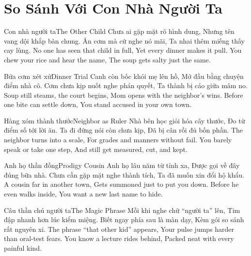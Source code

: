 \chapter{So Sánh Với Con Nhà Người Ta}

\begin{tutuyetbox}{Con nhà người ta}{The Other Child}
Chưa ai gặp mặt rõ hình dung,
Nhưng tên vang dội khắp bàn chung.
Ăn cơm mà cứ nghe nó mãi,
Ta nhai thêm miếng thấy cay lùng.
\tcblower
No one has seen that child in full,
Yet every dinner makes it pull.
You chew your rice and hear the name,
The soup gets salty just the same.
\end{tutuyetbox}

\begin{tutuyetbox}{Bữa cơm xét xử}{Dinner Trial}
Canh còn bốc khói mẹ lên hồ,
Mở đầu bằng chuyện điểm nhà cô.
Cơm chưa kịp nuốt nghe phán quyết,
Ta thành bị cáo giữa mâm no.
\tcblower
Soup still steams, the court begins,
Mom opens with the neighbor's wins.
Before one bite can settle down,
You stand accused in your own town.
\end{tutuyetbox}

\begin{tutuyetbox}{Hàng xóm thành thước}{Neighbor as Ruler}
Nhà bên học giỏi hóa cây thước,
Đo từ điểm số tới lời ăn.
Ta đi đứng nói còn chưa kịp,
Đã bị cân rồi đủ bốn phần.
\tcblower
The neighbor turns into a scale,
For grades and manners without fail.
You barely speak or take one step,
And still get measured, cut, and kept.
\end{tutuyetbox}

\begin{tutuyetbox}{Anh họ thần đồng}{Prodigy Cousin}
Anh họ lâu năm từ tỉnh xa,
Được gọi về đây đúng bữa nhà.
Chưa cần gặp mặt nghe thành tích,
Ta đã muốn xin đổi hộ khẩu.
\tcblower
A cousin far in another town,
Gets summoned just to put you down.
Before he even walks inside,
You want a new last name to hide.
\end{tutuyetbox}

\begin{tutuyetbox}{Câu thần chú người ta}{The Magic Phrase}
Mỗi khi nghe chữ “người ta” lên,
Tim đập nhanh hơn lúc kiểm miệng.
Biết ngay phía sau là màn dạy,
Kèm gói so sánh rất nguyên xi.
\tcblower
The phrase “that other kid” appears,
Your pulse jumps harder than oral-test fears.
You know a lecture rides behind,
Packed neat with every painful kind.
\end{tutuyetbox}

